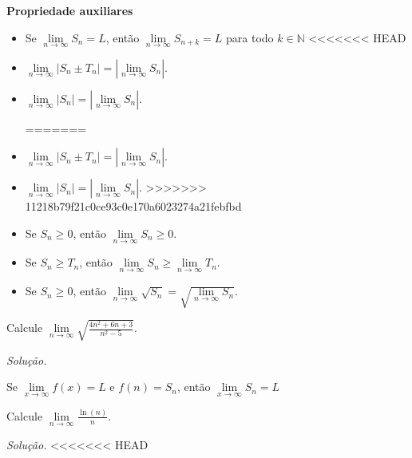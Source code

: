 \newpage
\textbf{Propriedade auxiliares}
\begin{itemize}
	\item Se  $\lim\limits_{n\longrightarrow \infty} S_{n}=L$, então $\lim\limits_{n\longrightarrow \infty} S_{n+k}=L$ para todo $k\in \mathbb{N} $
<<<<<<< HEAD

	\item $\lim\limits_{n\longrightarrow \infty} \left|  S_{n}\pm T_{n}\right|  =\left| \lim\limits_{n\longrightarrow \infty}  S_{n}\right| $.

	\item $\lim\limits_{n\longrightarrow \infty} \left|  S_{n}\right|  =\left| \lim\limits_{n\longrightarrow \infty}  S_{n}\right| $.

=======
	\item $\lim\limits_{n\longrightarrow \infty} \left|  S_{n}\pm T_{n}\right|  =\left| \lim\limits_{n\longrightarrow \infty}  S_{n}\right| $.
	\item $\lim\limits_{n\longrightarrow \infty} \left|  S_{n}\right|  =\left| \lim\limits_{n\longrightarrow \infty}  S_{n}\right| $.
>>>>>>> 11218b79f21c0ce93c0e170a6023274a21febfbd
	\item Se $S_{n}\geq 0$, então $\lim\limits_{n\longrightarrow \infty} S_{n} \geq 0$.
	\item Se $S_{n}\geq T_{n}$, então $\lim\limits_{n\longrightarrow \infty} S_{n} \geq \lim\limits_{n\longrightarrow \infty}T_{n}$.
	\item Se $S_{n}\geq 0$, então $\lim\limits_{n\longrightarrow \infty} \sqrt{S_{n}} =\sqrt{\lim\limits_{n\longrightarrow \infty} S_{n} }$.
\end{itemize}
\begin{ex}
	Calcule $\lim\limits_{n\longrightarrow \infty}\sqrt{\frac{4n^{2}+6n+3}{n^{2}-5}} $.
\end{ex}
\textit{Solução.}
\vspace*{5cm}
\begin{teo} 
	Se $\lim\limits_{x\longrightarrow \infty} f(x)=L$ e $f(n)=S_{n}$, então $\lim\limits_{x\longrightarrow \infty} S_{n}=L$
\end{teo}
\begin{ex}
	Calcule $\lim\limits_{n\longrightarrow \infty}\frac{\ln (n)}{n} $.
\end{ex}
\textit{Solução.}
\vspace*{5cm}
<<<<<<< HEAD

